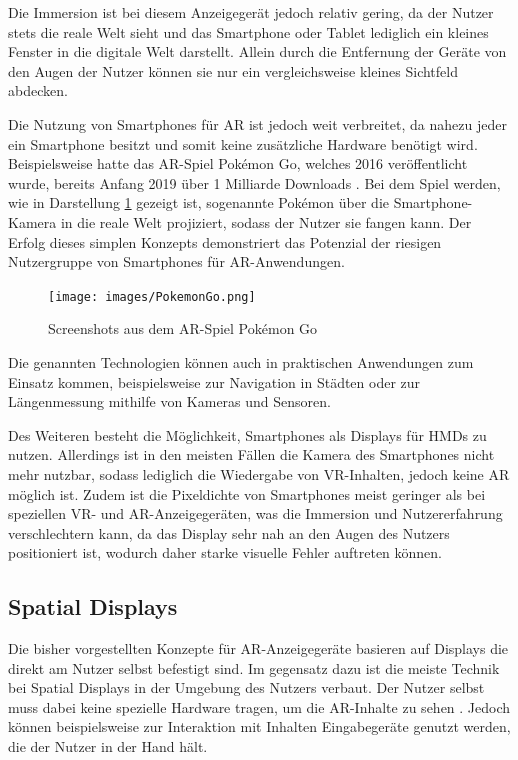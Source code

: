   Die Immersion ist bei diesem Anzeigegerät jedoch relativ gering, da der Nutzer stets die reale Welt sieht und das Smartphone oder Tablet lediglich ein kleines Fenster in die digitale Welt darstellt.
  Allein durch die Entfernung der Geräte von den Augen der Nutzer können sie nur ein vergleichsweise kleines Sichtfeld abdecken.

  Die Nutzung von Smartphones für AR ist jedoch weit verbreitet, da nahezu jeder ein Smartphone besitzt und somit keine zusätzliche Hardware benötigt wird.
  Beispielsweise hatte das AR-Spiel Pok\'emon Go, welches 2016 veröffentlicht wurde, bereits Anfang 2019 über 1 Milliarde Downloads \autocite[][]{pokemon-go-stats}.
  Bei dem Spiel werden, wie in Darstellung \ref*{fig:pokemon-go} gezeigt ist, sogenannte Pok\'emon über die Smartphone-Kamera in die reale Welt projiziert, sodass der Nutzer sie fangen kann.
  Der Erfolg dieses simplen Konzepts demonstriert das Potenzial der riesigen Nutzergruppe von Smartphones für AR-Anwendungen.


  \begin{figure}[H]
    \centering
    \texttt{[image: images/PokemonGo.png]}
    \caption{Screenshots aus dem AR-Spiel Pok\'emon Go}
    \label{fig:pokemon-go}
  \end{figure}

  Die genannten Technologien können auch in praktischen Anwendungen zum Einsatz kommen, beispielsweise zur Navigation in Städten oder zur Längenmessung mithilfe von Kameras und Sensoren.

  Des Weiteren besteht die Möglichkeit, Smartphones als Displays für HMDs zu nutzen.
  Allerdings ist in den meisten Fällen die Kamera des Smartphones nicht mehr nutzbar, sodass lediglich die Wiedergabe von VR-Inhalten, jedoch keine AR möglich ist.
  Zudem ist die Pixeldichte von Smartphones meist geringer als bei speziellen VR- und AR-Anzeigegeräten, was die Immersion und Nutzererfahrung verschlechtern kann, da das Display sehr nah an den Augen des Nutzers positioniert ist, wodurch daher starke visuelle Fehler auftreten können.

  

  \subsection{Spatial Displays}

  Die bisher vorgestellten Konzepte für AR-Anzeigegeräte basieren auf Displays die direkt am Nutzer selbst befestigt sind.
  Im gegensatz dazu ist die meiste Technik bei Spatial Displays in der Umgebung des Nutzers verbaut.
  Der Nutzer selbst muss dabei keine spezielle Hardware tragen, um die AR-Inhalte zu sehen \autocite[]{bimber2006modern}.
  Jedoch können beispielsweise zur Interaktion mit Inhalten Eingabegeräte genutzt werden, die der Nutzer in der Hand hält.

